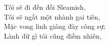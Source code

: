 \indent
Tôi sẽ đi đến đồi Sleamish,\\
Tôi sẽ ngắt một nhành gai tiên,\\
\indent
Mặc vong linh giáng đày công sự;\\
Lành dữ gì tôi cũng điềm nhiên,\\